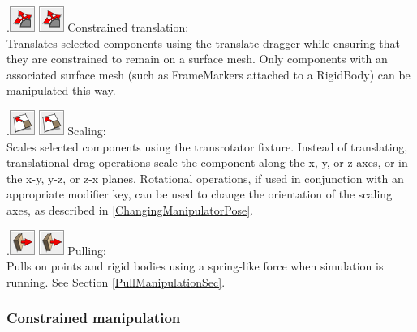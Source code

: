 \documentclass{article}
\begin{document}
\vspace{\parskip}
\iflatexml
.\includegraphics[]{images/constrainedTool}
\else
\includegraphics[width=.33in]{images/constrainedTool}
\fi 
{\sf Constrained translation:}\\
Translates selected components using the translate dragger while ensuring that
they are constrained to remain on a surface mesh. Only components with
an associated surface mesh (such as FrameMarkers attached to a
RigidBody) can be manipulated this way.

\vspace{\parskip}
\iflatexml
.\includegraphics[]{images/scaleTool}
\else
\includegraphics[width=.33in]{images/scaleTool}
\fi
{\sf Scaling:}\\
Scales selected components using the transrotator
fixture. Instead of translating, translational drag operations
scale the component along the x, y, or z axes, or in the
x-y, y-z, or z-x planes. Rotational operations, if
used in conjunction with an appropriate modifier key,
can be used to change the orientation of the scaling axes,
as described in \ref{ChangingManipulatorPose}.

\vspace{\parskip}
\iflatexml
.\includegraphics[]{images/pullTool}
\else
\includegraphics[width=.33in]{images/pullTool}
\fi
{\sf Pulling:}\\
Pulls on points and rigid bodies using a spring-like force
when simulation is running. See Section \ref{PullManipulationSec}.


\subsubsection{Constrained manipulation}
\end{document}
